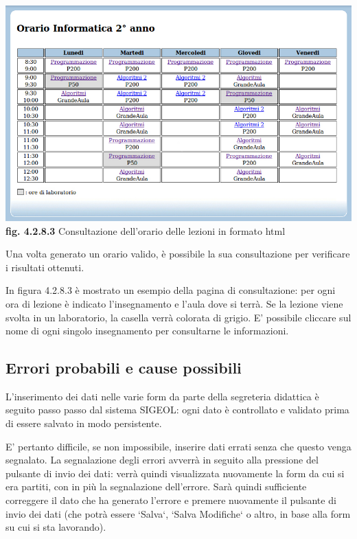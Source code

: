 \documentclass[11pt,a4paper]{article}
\begin{document}
\bigskip
\begin{center}
	\includegraphics[scale=0.42]{images/visualizzazione_orario.jpg}\\
	\textbf{fig. 4.2.8.3} Consultazione dell'orario delle lezioni in formato html\\
\end{center}
\bigskip

Una volta generato un orario valido, è possibile la sua consultazione per verificare i risultati ottenuti.

In figura 4.2.8.3 è mostrato un esempio della pagina di consultazione: per ogni ora di lezione è indicato l'insegnamento e l'aula dove si terrà. Se la lezione viene svolta in un laboratorio, la casella verrà colorata di grigio. E' possibile cliccare sul nome di ogni singolo insegnamento per consultarne le informazioni.
\subsection{Errori probabili e cause possibili}
L'inserimento dei dati nelle varie form da parte della segreteria didattica è seguito passo passo dal sistema SIGEOL: ogni dato è controllato e validato prima di essere salvato in modo persistente.

E' pertanto difficile, se non impossibile, inserire dati errati senza che questo venga segnalato.
La segnalazione degli errori avverrà in seguito alla pressione del pulsante di invio dei dati: verrà quindi visualizzata nuovamente la form da cui si era partiti, con in più la segnalazione dell'errore. Sarà quindi sufficiente correggere il dato che ha generato l'errore e premere nuovamente il pulsante di invio dei dati (che potrà essere `Salva`, `Salva Modifiche` o altro, in base alla form su cui si sta lavorando).
\end{document}
